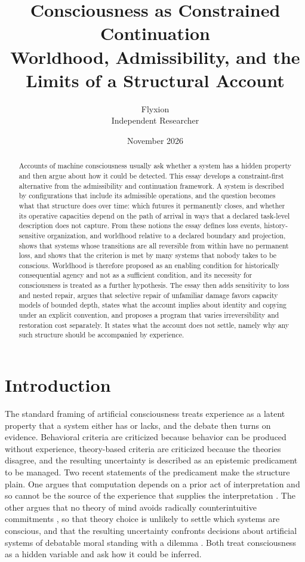\documentclass[11pt]{article}
\title{Consciousness as Constrained Continuation\\[0.4em]\large Worldhood, Admissibility, and the Limits of a Structural Account}
\author{Flyxion\\Independent Researcher}
\date{November 2026}
\theoremstyle{definition}
\theoremstyle{plain}
\theoremstyle{remark}
\begin{document}
\maketitle

\begin{abstract}
\noindent Accounts of machine consciousness usually ask whether a system has a hidden property and then argue about how it could be detected. This essay develops a constraint-first alternative from the admissibility and continuation framework. A system is described by configurations that include its admissible operations, and the question becomes what that structure does over time: which futures it permanently closes, and whether its operative capacities depend on the path of arrival in ways that a declared task-level description does not capture. From these notions the essay defines loss events, history-sensitive organization, and worldhood relative to a declared boundary and projection, shows that systems whose transitions are all reversible from within have no permanent loss, and shows that the criterion is met by many systems that nobody takes to be conscious. Worldhood is therefore proposed as an enabling condition for historically consequential agency and not as a sufficient condition, and its necessity for consciousness is treated as a further hypothesis. The essay then adds sensitivity to loss and nested repair, argues that selective repair of unfamiliar damage favors capacity models of bounded depth, states what the account implies about identity and copying under an explicit convention, and proposes a program that varies irreversibility and restoration cost separately. It states what the account does not settle, namely why any such structure should be accompanied by experience.
\end{abstract}

\newpage

\section{Introduction}

The standard framing of artificial consciousness treats experience as a latent property that a system either has or lacks, and the debate then turns on evidence. Behavioral criteria are criticized because behavior can be produced without experience, theory-based criteria are criticized because the theories disagree, and the resulting uncertainty is described as an epistemic predicament to be managed. Two recent statements of the predicament make the structure plain. One argues that computation depends on a prior act of interpretation and so cannot be the source of the experience that supplies the interpretation \cite{lerchner2026}. The other argues that no theory of mind avoids radically counterintuitive commitments \cite{schwitzgebel2014}, so that theory choice is unlikely to settle which systems are conscious, and that the resulting uncertainty confronts decisions about artificial systems of debatable moral standing with a dilemma \cite{schwitzgebel2023}. Both treat consciousness as a hidden variable and ask how it could be inferred.
\end{document}
